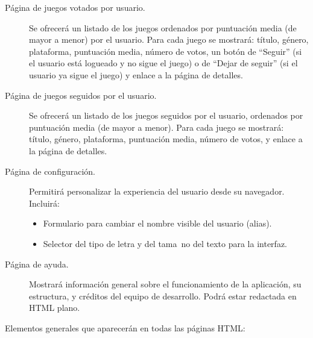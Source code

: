 \begin{description}
\item[Página de juegos votados por usuario.] Se ofrecerá un listado de los juegos ordenados por puntuación media (de mayor a menor) por el usuario. Para cada juego se mostrará: título, género, plataforma, puntuación media, número de votos, un botón de ``Seguir'' (si el usuario está logueado y no sigue el juego) o de ``Dejar de seguir'' (si el usuario ya sigue el juego) y enlace a la página de detalles.

\item[Página de juegos seguidos por el usuario.] Se ofrecerá un listado de los juegos seguidos por el usuario, ordenados por puntuación media (de mayor a menor). Para cada juego se mostrará: título, género, plataforma, puntuación media, número de votos, y enlace a la página de detalles.

\item[Página de configuración.] Permitirá personalizar la experiencia del usuario desde su navegador. Incluirá:
\begin{itemize}
\item Formulario para cambiar el nombre visible del usuario (alias).
\item Selector del tipo de letra y del tama~no del texto para la interfaz.
\end{itemize}

\item[Página de ayuda.] Mostrará información general sobre el funcionamiento de la aplicación, su estructura, y créditos del equipo de desarrollo. Podrá estar redactada en HTML plano.

\end{description}



Elementos generales que aparecerán en todas las páginas HTML:

